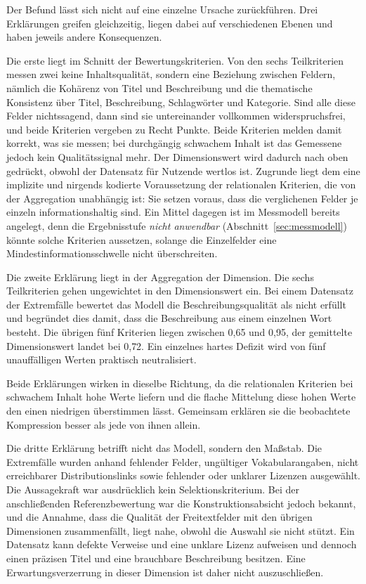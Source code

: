 Der Befund lässt sich nicht auf eine einzelne Ursache zurückführen. Drei
Erklärungen greifen gleichzeitig, liegen dabei auf verschiedenen Ebenen und haben
jeweils andere Konsequenzen.

Die erste liegt im Schnitt der Bewertungskriterien. Von den sechs Teilkriterien
messen zwei keine Inhaltsqualität, sondern eine Beziehung zwischen Feldern,
nämlich die Kohärenz von Titel und Beschreibung und die thematische Konsistenz
über Titel, Beschreibung, Schlagwörter und Kategorie. Sind alle diese Felder
nichtssagend, dann sind sie untereinander vollkommen widerspruchsfrei, und beide
Kriterien vergeben zu Recht Punkte. Beide Kriterien melden damit korrekt, was sie messen; bei durchgängig schwachem
Inhalt ist das Gemessene jedoch kein Qualitätssignal mehr. Der Dimensionswert wird
dadurch nach oben gedrückt, obwohl der Datensatz für Nutzende wertlos ist. Zugrunde liegt dem eine implizite und nirgends kodierte Voraussetzung der
relationalen Kriterien, die von der Aggregation unabhängig ist: Sie setzen voraus,
dass die verglichenen Felder je einzeln informationshaltig sind. Ein Mittel dagegen ist im Messmodell
bereits angelegt, denn die Ergebnisstufe \emph{nicht anwendbar}
(Abschnitt~\ref{sec:messmodell}) könnte solche Kriterien aussetzen, solange die
Einzelfelder eine Mindestinformationsschwelle nicht überschreiten.

Die zweite Erklärung liegt in der Aggregation der Dimension. Die sechs
Teilkriterien gehen ungewichtet in den Dimensionswert ein. Bei einem Datensatz
der Extremfälle bewertet das Modell die Beschreibungsqualität als nicht erfüllt
und begründet dies damit, dass die Beschreibung aus einem einzelnen Wort besteht.
Die übrigen fünf Kriterien liegen zwischen 0{,}65 und 0{,}95, der gemittelte
Dimensionswert landet bei 0{,}72. Ein einzelnes hartes Defizit wird von fünf
unauffälligen Werten praktisch neutralisiert.

Beide Erklärungen wirken in dieselbe Richtung, da die relationalen Kriterien bei
schwachem Inhalt hohe Werte liefern und die flache Mittelung diese hohen Werte den
einen niedrigen überstimmen lässt. Gemeinsam erklären sie die beobachtete
Kompression besser als jede von ihnen allein.

Die dritte Erklärung betrifft nicht das Modell, sondern den Maßstab. Die
Extremfälle wurden anhand fehlender Felder, ungültiger Vokabularangaben, nicht
erreichbarer Distributionslinks sowie fehlender oder unklarer Lizenzen
ausgewählt. Die Aussagekraft war ausdrücklich kein Selektionskriterium. Bei der
anschließenden Referenzbewertung war die Konstruktionsabsicht jedoch bekannt,
und die Annahme, dass die Qualität der Freitextfelder mit den übrigen Dimensionen
zusammenfällt, liegt nahe, obwohl die Auswahl sie nicht stützt. Ein Datensatz
kann defekte Verweise und eine unklare Lizenz aufweisen und dennoch einen
präzisen Titel und eine brauchbare Beschreibung besitzen. Eine
Erwartungsverzerrung in dieser Dimension ist daher nicht auszuschließen.

